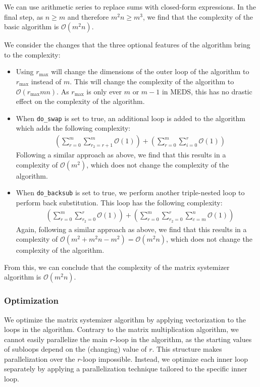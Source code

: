 \documentclass[11pt,a4paper]{report}
\theoremstyle{definition}
\begin{document}
We can use arithmetic series to replace sums with closed-form expressions. In the final step, as $n \geq m$ and therefore $m^2n \geq m^3$, we find that the complexity of the basic algorithm is $\mathcal{O}(m^2n)$.

We consider the changes that the three optional features of the algorithm bring to the complexity:
\begin{itemize}
  \item Using $r_\text{max}$ will change the dimensions of the outer loop of the algorithm to $r_\text{max}$ instead of $m$. This will change the complexity of the algorithm to $\mathcal{O}(r_\text{max}mn)$. As $r_\text{max}$ is only ever $m$ or $m-1$ in MEDS, this has no drastic effect on the complexity of the algorithm.
  \item When \texttt{do\_swap} is set to true, an additional loop is added to the algorithm which adds the following complexity:
        \begin{align*}
           & \left( \sum_{r=0}^{m} \sum_{r_2=r+1}^{m} \mathcal{O}(1) \right) + \left( \sum_{r=0}^{m} \sum_{i=0}^{r} \mathcal{O}(1) \right)
        \end{align*}
        Following a similar approach as above, we find that this results in a complexity of $\mathcal{O}(m^2)$, which does not change the complexity of the algorithm.
  \item When \texttt{do\_backsub} is set to true, we perform another triple-nested loop to perform back substitution. This loop has the following complexity:
        \begin{align*}
           & \left( \sum_{r=0}^{m} \sum_{r_2=0}^{r} \mathcal{O}(1) \right) + \left( \sum_{r=0}^{m} \sum_{r_2=0}^{r} \sum_{c=m}^{n} \mathcal{O}(1) \right)
        \end{align*}
        Again, following a similar approach as above, we find that this results in a complexity of $\mathcal{O}(m^2 + m^2n - m^2) = \mathcal{O}(m^2n)$, which does not change the complexity of the algorithm.
\end{itemize}
From this, we can conclude that the complexity of the matrix systemizer algorithm is $\mathcal{O}(m^2n)$.

\subsubsection{Optimization}
\label{sec:matrixsystemizeroptimization}
We optimize the matrix systemizer algorithm by applying vectorization to the loops in the algorithm. Contrary to the matrix multiplication algorithm, we cannot easily parallelize the main $r$-loop in the algorithm, as the starting values of subloops depend on the (changing) value of $r$. This structure makes parallelization over the $r$-loop impossible. Instead, we optimize each inner loop separately by applying a parallelization technique tailored to the specific inner loop.
\end{document}
